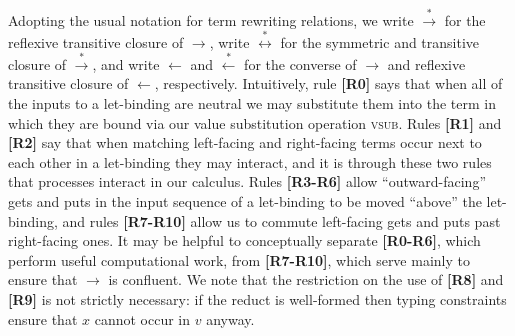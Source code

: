 \documentclass[twoside,11pt,final]{entics}
\newcommand{\from}{\leftarrow}
\begin{document}
Adopting the usual notation for term rewriting relations, we write $\stackrel{*}{\to}$ for the reflexive transitive closure of $\to$, write $\stackrel{*}{\leftrightarrow}$ for the symmetric and transitive closure of $\stackrel{*}{\to}$, and write $\from$ and $\stackrel{*}{\from}$ for the converse of $\to$ and reflexive transitive closure of $\from$, respectively. Intuitively, rule \textbf{[R0]} says that when all of the inputs to a let-binding are neutral we may substitute them into the term in which they are bound via our value substitution operation \textsc{vsub}. Rules \textbf{[R1]} and \textbf{[R2]} say that when matching left-facing and right-facing terms occur next to each other in a let-binding they may interact, and it is through these two rules that processes interact in our calculus. Rules \textbf{[R3-R6]} allow ``outward-facing'' gets and puts in the input sequence of a let-binding to be moved ``above'' the let-binding, and rules \textbf{[R7-R10]} allow us to commute left-facing gets and puts past right-facing ones. It may be helpful to conceptually separate \textbf{[R0-R6]}, which perform useful computational work, from \textbf{[R7-R10]}, which serve mainly to ensure that $\to$ is confluent. We note that the restriction on the use of \textbf{[R8]} and \textbf{[R9]} is not strictly necessary: if the reduct is well-formed then typing constraints ensure that $x$ cannot occur in $v$ anyway. 
\end{document}
